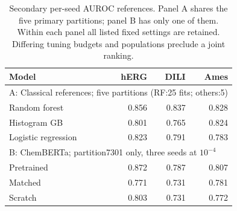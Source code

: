 \begin{table}[t]
\centering
\caption{Secondary per-seed AUROC references. Panel A shares the five primary partitions; panel B has only one of them. Within each panel all listed fixed settings are retained. Differing tuning budgets and populations preclude a joint ranking.}\label{tab:secondary}
\small
\begin{tabular*}{.92\linewidth}{@{\extracolsep{\fill}}lrrr}
\toprule
Model & hERG & DILI & Ames\\
\midrule
\multicolumn{4}{l}{A: Classical references; five partitions (RF:25 fits; others:5)}\\
Random forest & 0.856 & 0.837 & 0.828\\
Histogram GB & 0.801 & 0.765 & 0.824\\
Logistic regression & 0.823 & 0.791 & 0.783\\
\midrule
\multicolumn{4}{l}{B: ChemBERTa; partition7301 only, three seeds at $10^{-4}$}\\
Pretrained & 0.872 & 0.787 & 0.807\\
Matched & 0.771 & 0.731 & 0.781\\
Scratch & 0.803 & 0.731 & 0.772\\
\bottomrule
\end{tabular*}
\end{table}
